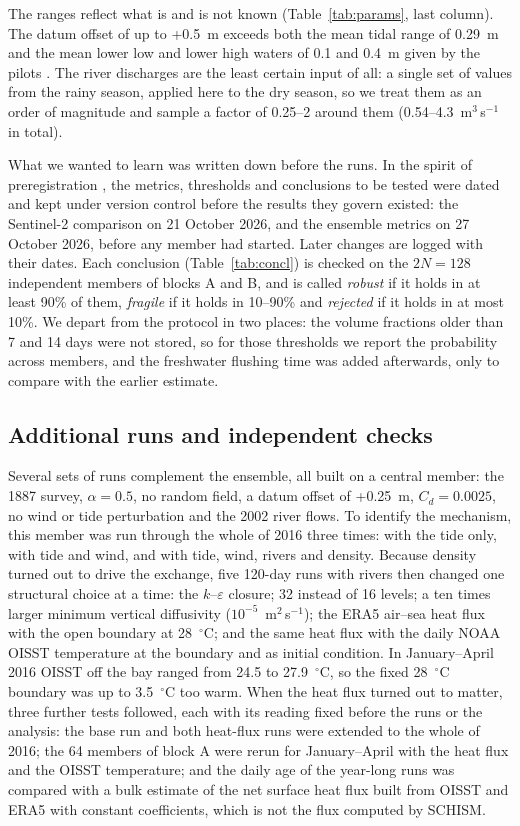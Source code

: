 \documentclass[a4paper,fleqn]{ems-dc}
\begin{document}
The ranges reflect what is and is not known (Table~\ref{tab:params}, last column). The
datum offset of up to +0.5~m exceeds both the mean tidal range of 0.29~m \citep{JICA2004} and
the mean lower low and lower high waters of 0.1 and 0.4~m given by the pilots
\citep{Practicos2018}. The river discharges are the least certain input of all: a single set
of values from the rainy season, applied here to the dry season, so we treat them as an order
of magnitude and sample a factor of 0.25--2 around them (0.54--4.3~m$^3$\,s$^{-1}$ in
total).

What we wanted to learn was written down before the runs. In the spirit of preregistration
\citep{Nosek2018}, the metrics, thresholds and conclusions to be tested were dated and kept
under version control before the results they govern existed: the Sentinel-2 comparison on
21 October 2026, and the ensemble metrics on 27 October 2026, before any member had started.
Later changes are logged with their dates. Each conclusion (Table~\ref{tab:concl}) is checked
on the $2N = 128$ independent members of blocks A and B, and is called \emph{robust} if it
holds in at least 90\% of them, \emph{fragile} if it holds in 10--90\% and \emph{rejected} if
it holds in at most 10\%. We depart from the protocol in two places: the volume fractions
older than 7 and 14 days were not stored, so for those thresholds we report the probability
across members, and the freshwater flushing time was added afterwards, only to compare with
the earlier estimate.

\subsection{Additional runs and independent checks}\label{sec:extra}\label{sec:eval}
Several sets of runs complement the ensemble, all built on a central member: the 1887
survey, $\alpha = 0.5$, no random field, a datum offset of +0.25~m, $C_d = 0.0025$, no wind
or tide perturbation and the 2002 river flows. To identify the mechanism, this member was
run through the whole of 2016 three times: with the tide only, with tide and wind, and with
tide, wind, rivers and density. Because density turned out to drive the exchange, five
120-day runs with rivers then changed one structural choice at a time: the
$k$--$\varepsilon$ closure; 32 instead of 16 levels; a ten times larger minimum vertical
diffusivity ($10^{-5}$~m$^2$\,s$^{-1}$); the ERA5 air--sea heat flux with the open boundary
at 28~$^\circ$C; and the same heat flux with the daily NOAA OISST temperature
\citep{Huang2021} at the boundary and as initial condition. In January--April 2016 OISST off
the bay ranged from 24.5 to 27.9~$^\circ$C, so the fixed 28~$^\circ$C boundary was up to
3.5~$^\circ$C too warm. When the heat flux turned out to matter, three further tests
followed, each with its reading fixed before the runs or the analysis: the base run and both
heat-flux runs were extended to the whole of 2016; the 64 members of block A were rerun for
January--April with the heat flux and the OISST temperature; and the daily age of the
year-long runs was compared with a bulk estimate of the net surface heat flux built from
OISST and ERA5 with constant coefficients, which is not the flux computed by SCHISM.
\end{document}
